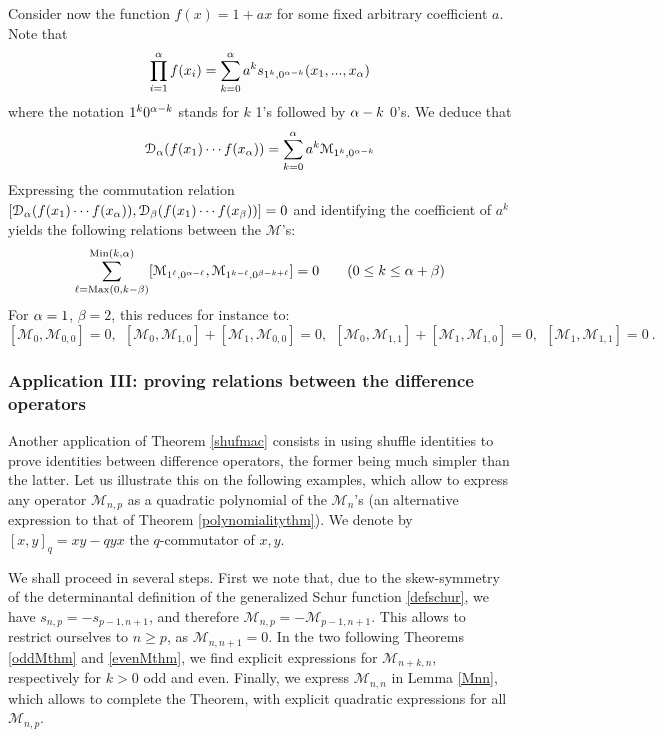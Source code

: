 Consider now the function $f(x)=1+a x$ for some fixed arbitrary coefficient $a$. Note that
$$\prod_{i=1}^{\alpha} f(x_i)=\sum_{k=0}^{\alpha} a^k s_{1^k,0^{{\alpha}-k}}(x_1,...,x_{\alpha})$$
where the notation $1^k0^{{\alpha}-k}$ stands for $k$ 1's followed by ${\alpha}-k$ 0's. We deduce that
$${\mathcal D}_{\alpha}(f(x_1)\cdots f(x_{\alpha}))=\sum_{k=0}^{\alpha} a^k {\mathcal M}_{1^k,0^{{\alpha}-k}}$$
Expressing the commutation relation 
$[{\mathcal D}_{\alpha}(f(x_1)\cdots f(x_{\alpha})),{\mathcal D}_\beta(f(x_1)\cdots f(x_\beta))]=0$
and identifying the coefficient of $a^k$ yields the following relations between the ${\mathcal M}$'s:
$$\sum_{\ell={\rm Max}(0,k-\beta)}^{{\rm Min}(k,{\alpha})} 
[{\mathcal M}_{1^\ell,0^{{\alpha}-\ell}},{\mathcal M}_{1^{k-\ell},0^{\beta-k+\ell}}]=0\qquad (0\leq k\leq {\alpha}+\beta)$$
For ${\alpha}=1$, $\beta=2$, this reduces for instance to:
$$[{\mathcal M}_0,{\mathcal M}_{0,0}]=0, 
\ \ [{\mathcal M}_0,{\mathcal M}_{1,0}]+[{\mathcal M}_1,{\mathcal M}_{0,0}]=0, \ \ 
[{\mathcal M}_0,{\mathcal M}_{1,1}]+[{\mathcal M}_1,{\mathcal M}_{1,0}]=0, 
\ \  [{\mathcal M}_1,{\mathcal M}_{1,1}]=0\ .
$$

\subsubsection{Application III: proving relations between the difference operators}\label{appsecthree}

Another application of Theorem \ref{shufmac} consists in using shuffle identities to prove identities between 
difference operators, the former being much simpler than the latter. Let us illustrate this on the following
examples, which allow to express any operator ${\mathcal M}_{n,p}$ as a quadratic polynomial 
of the ${\mathcal M}_{n}$'s (an alternative expression to that of Theorem \ref{polynomialitythm}). 
We denote by $[x,y]_q=xy-q yx$ the $q$-commutator of $x,y$.

We shall proceed in several steps. First we note that, due to the skew-symmetry of the determinantal 
definition of the generalized Schur function \eqref{defschur}, we have $s_{n,p}=-s_{p-1,n+1}$, and therefore
${\mathcal M}_{n,p}=-{\mathcal M}_{p-1,n+1}$. This allows to restrict ourselves to $n\geq p$, as
${\mathcal M}_{n,n+1}=0$. In the two following Theorems \ref{oddMthm} and \ref{evenMthm}, we find explicit 
expressions for ${\mathcal M}_{n+k,n}$,
respectively for $k>0$ odd and even. Finally, we express ${\mathcal M}_{n,n}$ in Lemma \ref{Mnn}, which allows to
complete the Theorem, with explicit quadratic expressions for all ${\mathcal M}_{n,p}$.

